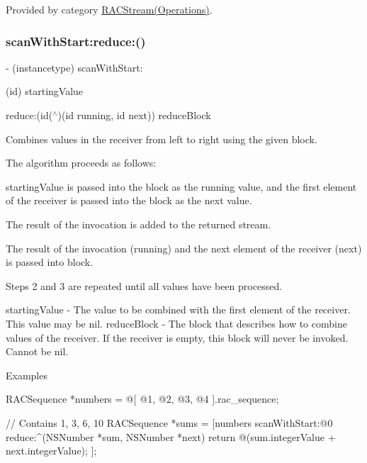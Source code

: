 Provided by category \mbox{\hyperlink{category_r_a_c_stream_07_operations_08_aa86990e9bc4cbc3dff2815f56b907b41}{R\+A\+C\+Stream(\+Operations)}}.

\mbox{\label{interface_r_a_c_stream_aa86990e9bc4cbc3dff2815f56b907b41}} 
\subsubsection{\texorpdfstring{scan\+With\+Start\+:reduce\+:()}{scanWithStart:reduce:()}\hspace{0.1cm}{\footnotesize\ttfamily [3/3]}}
{\footnotesize\ttfamily -\/ (instancetype) scan\+With\+Start\+: \begin{DoxyParamCaption}\item[{(id)}]{starting\+Value }\item[{reduce:(id($^\wedge$)(id running, id next))}]{reduce\+Block }\end{DoxyParamCaption}}

Combines values in the receiver from left to right using the given block.

The algorithm proceeds as follows\+:


\begin{DoxyEnumerate}
\item {\ttfamily starting\+Value} is passed into the block as the {\ttfamily running} value, and the first element of the receiver is passed into the block as the {\ttfamily next} value.
\item The result of the invocation is added to the returned stream.
\item The result of the invocation ({\ttfamily running}) and the next element of the receiver ({\ttfamily next}) is passed into {\ttfamily block}.
\item Steps 2 and 3 are repeated until all values have been processed.
\end{DoxyEnumerate}

starting\+Value -\/ The value to be combined with the first element of the receiver. This value may be {\ttfamily nil}. reduce\+Block -\/ The block that describes how to combine values of the receiver. If the receiver is empty, this block will never be invoked. Cannot be nil.

Examples \begin{DoxyVerb} RACSequence *numbers = @[ @1, @2, @3, @4 ].rac_sequence;

 // Contains 1, 3, 6, 10
 RACSequence *sums = [numbers scanWithStart:@0 reduce:^(NSNumber *sum, NSNumber *next) {
     return @(sum.integerValue + next.integerValue);
 }];
\end{DoxyVerb}


